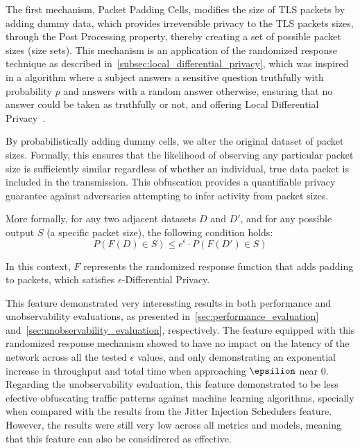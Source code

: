 The first mechanism, Packet Padding Cells, modifies the size of TLS packets by adding dummy data, which provides irreversible privacy to the TLS packets sizes, through the Post Processing property, thereby creating a set of possible packet sizes (size sets).
This mechanism is an application of the randomized response technique as described in~\autoref{subsec:local_differential_privacy}, which was inspired in a algorithm where a subject answers a sensitive question truthfully with probability $p$ and answers with a random answer otherwise, ensuring that no answer could be taken as truthfully or not, and offering Local Differential Privacy~\cite{RandomizedResponse, AlgFoundationsDP}.




By probabilistically adding dummy cells, we alter the original dataset of packet sizes. Formally, this ensures that the likelihood of observing any particular packet size is sufficiently similar regardless of whether an individual, true data packet is included in the transmission. This obfuscation provides a quantifiable privacy guarantee against adversaries attempting to infer activity from packet sizes.

More formally, for any two adjacent datasets $D$ and $D'$, and for any possible output $S$ (a specific packet size), the following condition holds:
\[P(F(D) \in S) \leq e^{\epsilon} \cdot P(F(D') \in S)\]

In this context, $F$ represents the randomized response function that adds padding to packets, which satisfies $\epsilon$-Differential Privacy. 

This feature demonstrated very interessting results in both performance and unobservability evaluations, as presented in~\autoref{sec:performance_evaluation} and~\autoref{sec:unobservability_evaluation}, respectively. The feature equipped with this randomized response mechanism showed to have no impact on the latency of the network across all the tested $\epsilon$ values, and only demonstrating an exponential increase in throughput and total time when approaching $\epsilion$ near 0. Regarding the unobservability evaluation, this feature demonstrated to be less efective obfuscating traffic patterns against machine learning algorithms, specially when compared with the results from the Jitter Injection Schedulers feature. However, the results were still very low across all metrics and models, meaning that this feature can also be considirered as effective.


